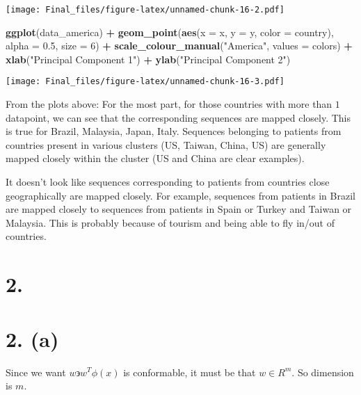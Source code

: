 \documentclass[]{article}
\newenvironment{Shaded}{\begin{snugshade}}{\end{snugshade}}
\newcommand{\DataTypeTok}[1]{\textcolor[rgb]{0.13,0.29,0.53}{#1}}
\newcommand{\DecValTok}[1]{\textcolor[rgb]{0.00,0.00,0.81}{#1}}
\newcommand{\FloatTok}[1]{\textcolor[rgb]{0.00,0.00,0.81}{#1}}
\newcommand{\KeywordTok}[1]{\textcolor[rgb]{0.13,0.29,0.53}{\textbf{#1}}}
\newcommand{\NormalTok}[1]{#1}
\newcommand{\OperatorTok}[1]{\textcolor[rgb]{0.81,0.36,0.00}{\textbf{#1}}}
\newcommand{\StringTok}[1]{\textcolor[rgb]{0.31,0.60,0.02}{#1}}
\begin{document}
\texttt{[image: Final\_files/figure-latex/unnamed-chunk-16-2.pdf]}

\begin{Shaded}
\begin{Highlighting}[]
\KeywordTok{ggplot}\NormalTok{(data_america) }\OperatorTok{+}
\StringTok{  }\KeywordTok{geom_point}\NormalTok{(}\KeywordTok{aes}\NormalTok{(}\DataTypeTok{x =}\NormalTok{ x, }\DataTypeTok{y =}\NormalTok{ y, }\DataTypeTok{color =}\NormalTok{ country), }\DataTypeTok{alpha =} \FloatTok{0.5}\NormalTok{, }\DataTypeTok{size =} \DecValTok{6}\NormalTok{) }\OperatorTok{+}
\StringTok{  }\KeywordTok{scale_colour_manual}\NormalTok{(}\StringTok{"America"}\NormalTok{, }\DataTypeTok{values =}\NormalTok{ colors) }\OperatorTok{+}
\StringTok{  }\KeywordTok{xlab}\NormalTok{(}\StringTok{"Principal Component 1"}\NormalTok{) }\OperatorTok{+}\StringTok{ }\KeywordTok{ylab}\NormalTok{(}\StringTok{"Principal Component 2"}\NormalTok{)}
\end{Highlighting}
\end{Shaded}

\texttt{[image: Final\_files/figure-latex/unnamed-chunk-16-3.pdf]}

From the plots above: For the most part, for those countries with more
than \(1\) datapoint, we can see that the corresponding sequences are
mapped closely. This is true for Brazil, Malaysia, Japan, Italy.
Sequences belonging to patients from countries present in various
clusters (US, Taiwan, China, US) are generally mapped closely within the
cluster (US and China are clear examples).

It doesn't look like sequences corresponding to patients from countries
close geographically are mapped closely. For example, sequences from
patients in Brazil are mapped closely to sequences from patients in
Spain or Turkey and Taiwan or Malaysia. This is probably because of
tourism and being able to fly in/out of countries.

\hypertarget{section-1}{%
\section{2.}\label{section-1}}

\hypertarget{a}{%
\section{2. (a)}\label{a}}

Since we want \(w \backepsilon w^T\phi(x)\) is conformable, it must be
that \(w \in R^m.\) So dimension is \(m\).
\end{document}
